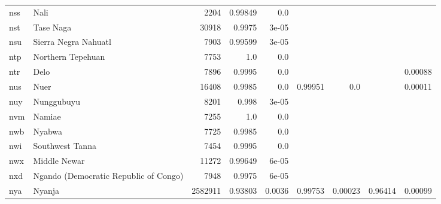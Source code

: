 \documentclass[11pt]{article}
\begin{document}
\begin{table*}[h]
{\begin{tabular}{llrrrrrrr}
nss         & Nali         & 2204         & 0.99849         & 0.0         &          &          &          &          \\

nst         & Tase Naga         & 30918         & 0.9975         & 3e-05         &          &          &          &          \\

nsu         & Sierra Negra Nahuatl         & 7903         & 0.99599         & 3e-05         &          &          &          &          \\

ntp         & Northern Tepehuan         & 7753         & 1.0         & 0.0         &          &          &          &          \\

ntr         & Delo         & 7896         & 0.9995         & 0.0         &          &          &          & 0.00088         \\

nus         & Nuer         & 16408         & 0.9985         & 0.0         & 0.99951         & 0.0         &          & 0.00011         \\

nuy         & Nunggubuyu         & 8201         & 0.998         & 3e-05         &          &          &          &          \\

nvm         & Namiae         & 7255         & 1.0         & 0.0         &          &          &          &          \\

nwb         & Nyabwa         & 7725         & 0.9985         & 0.0         &          &          &          &          \\

nwi         & Southwest Tanna         & 7454         & 0.9995         & 0.0         &          &          &          &          \\

nwx         & Middle Newar         & 11272         & 0.99649         & 6e-05         &          &          &          &          \\

nxd         & Ngando (Democratic Republic of Congo)         & 7948         & 0.9975         & 6e-05         &          &          &          &          \\

nya         & Nyanja         & 2582911         & 0.93803         & 0.0036         & 0.99753         & 0.00023         & 0.96414         & 0.00099         \\


\end{tabular}}
\end{table*}
\end{document}

